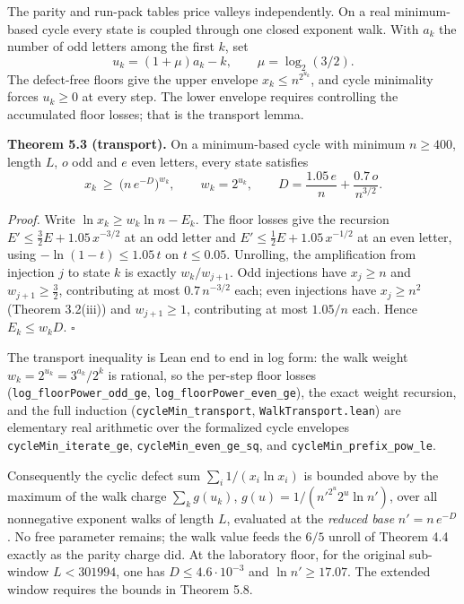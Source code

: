 \documentclass[12pt]{article}
\begin{document}
The parity and run-pack tables price valleys independently. On a real
minimum-based cycle every state is coupled through one closed exponent
walk. With \(a_k\) the number of odd letters among the first \(k\), set
\[
u_k=(1+\mu)a_k-k,\qquad \mu=\log_2(3/2).
\] The defect-free floors give the upper envelope
\(x_k\le n^{2^{u_k}}\), and cycle minimality forces \(u_k\ge 0\) at
every step. The lower envelope requires controlling the accumulated
floor losses; that is the transport lemma.

\textbf{Theorem 5.3 (transport).} On a minimum-based cycle with minimum
\(n\ge 400\), length \(L\), \(o\) odd and \(e\) even letters, every
state satisfies \[
x_k\ \ge\ \bigl(n\,e^{-D}\bigr)^{w_k},
\qquad
w_k=2^{u_k},
\qquad
D=\frac{1.05\,e}{n}+\frac{0.7\,o}{n^{3/2}}.
\]

\emph{Proof.} Write \(\ln x_k\ge w_k\ln n-E_k\). The floor losses give
the recursion \(E'\le\tfrac32E+1.05\,x^{-3/2}\) at an odd letter and
\(E'\le\tfrac12E+1.05\,x^{-1/2}\) at an even letter, using
\(-\ln(1-t)\le 1.05\,t\) on \(t\le 0.05\). Unrolling, the amplification
from injection \(j\) to state \(k\) is exactly \(w_k/w_{j+1}\). Odd
injections have \(x_j\ge n\) and \(w_{j+1}\ge\tfrac32\), contributing at
most \(0.7\,n^{-3/2}\) each; even injections have \(x_j\ge n^2\)
(Theorem 3.2(iii)) and \(w_{j+1}\ge 1\), contributing at most \(1.05/n\)
each. Hence \(E_k\le w_k D\). \(\square\)

The transport inequality is Lean end to end in log form: the walk weight
\(w_k=2^{u_k}=3^{a_k}/2^k\) is rational, so the per-step floor losses
(\texttt{\nolinkurl{log_floorPower_odd_ge}},
\texttt{\nolinkurl{log_floorPower_even_ge}}), the exact weight
recursion, and the full induction
(\texttt{\nolinkurl{cycleMin_transport}},
\texttt{\nolinkurl{WalkTransport.lean}}) are elementary real arithmetic
over the formalized cycle envelopes
\texttt{\nolinkurl{cycleMin_iterate_ge}},
\texttt{\nolinkurl{cycleMin_even_ge_sq}}, and
\texttt{\nolinkurl{cycleMin_prefix_pow_le}}.

Consequently the cyclic defect sum \(\sum_i 1/(x_i\ln x_i)\) is bounded
above by the maximum of the walk charge \(\sum_k g(u_k)\),
\(g(u)=1/(n'^{2^u}2^u\ln n')\), over all nonnegative exponent walks of
length \(L\), evaluated at the \emph{reduced base} \(n'=n\,e^{-D}\). No
free parameter remains; the walk value feeds the \(6/5\) unroll of
Theorem 4.4 exactly as the parity charge did. At the laboratory floor,
for the original sub-window \(L<301994\), one has
\(D\le4.6\cdot10^{-3}\) and \(\ln n'\ge17.07\). The extended window
requires the bounds in Theorem 5.8.
\end{document}
